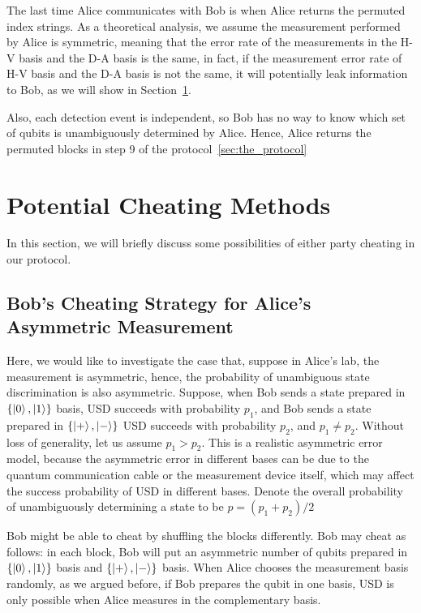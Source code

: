 \documentclass[%
 reprint,
superscriptaddress,
 amsmath,amssymb,
 aps,
]{revtex4-2}
\begin{document}
The last time Alice communicates with Bob is when Alice returns the permuted index strings. As a theoretical analysis, we assume the measurement performed by Alice is symmetric, meaning that the error rate of the measurements in the H-V basis and the D-A basis is the same, in fact, if the measurement error rate of H-V basis and the D-A basis is not the same, it will potentially leak information to Bob, as we will show in Section~\ref{sec:potential_cheating}.

Also, each detection event is independent, so Bob has no way to know which set of qubits is unambiguously determined by Alice. Hence, Alice returns the permuted blocks in step 9 of the protocol~\ref{sec:the_protocol}

\section{Potential Cheating Methods}
\label{sec:potential_cheating}

In this section, we will briefly discuss some possibilities of either party cheating in our protocol.

\subsection{Bob's Cheating Strategy for Alice's Asymmetric Measurement}

Here, we would like to investigate the case that, suppose in Alice's lab, the measurement is asymmetric, hence, the probability of unambiguous state discrimination is also asymmetric. Suppose, when Bob sends a state prepared in $\{\ket{0}, \ket{1}\}$ basis, USD succeeds with probability $p_1$, and Bob sends a state prepared in $\{\ket{+}, \ket{-}\}$ USD succeeds with probability $p_2$, and $p_1\ne p_2$. Without loss of generality, let us assume $p_1> p_2$. This is a realistic asymmetric error model, because the asymmetric error in different bases can be due to the quantum communication cable or the measurement device itself, which may affect the success probability of USD in different bases. Denote the overall probability of unambiguously determining a state to be $p=(p_1+p_2)/2$

Bob might be able to cheat by shuffling the blocks differently. Bob may cheat as follows: in each block, Bob will put an asymmetric number of qubits prepared in $\{\ket{0}, \ket{1}\}$ basis and $\{\ket{+}, \ket{-}\}$ basis. When Alice chooses the measurement basis randomly, as we argued before, if Bob prepares the qubit in one basis, USD is only possible when Alice measures in the complementary basis.
\end{document}

